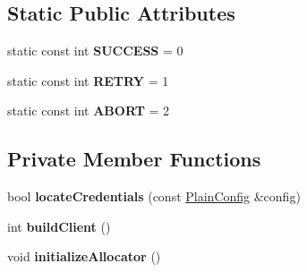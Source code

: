 \subsection*{Static Public Attributes}
\begin{DoxyCompactItemize}
\item 
\mbox{\label{class_aws_1_1_iot_1_1_device_client_1_1_shared_crt_resource_manager_ae853200444418700fe8c6c2384d1a981}} 
static const int {\bfseries S\+U\+C\+C\+E\+SS} = 0
\item 
\mbox{\label{class_aws_1_1_iot_1_1_device_client_1_1_shared_crt_resource_manager_a4ea6b778c387b63abeaee2d0099f6044}} 
static const int {\bfseries R\+E\+T\+RY} = 1
\item 
\mbox{\label{class_aws_1_1_iot_1_1_device_client_1_1_shared_crt_resource_manager_a60e67742ab42176a7a1b3c9a4100779e}} 
static const int {\bfseries A\+B\+O\+RT} = 2
\end{DoxyCompactItemize}
\subsection*{Private Member Functions}
\begin{DoxyCompactItemize}
\item 
\mbox{\label{class_aws_1_1_iot_1_1_device_client_1_1_shared_crt_resource_manager_a754e8d34e2ace5c551753c581653c254}} 
bool {\bfseries locate\+Credentials} (const \hyperlink{struct_aws_1_1_iot_1_1_device_client_1_1_plain_config}{Plain\+Config} \&config)
\item 
\mbox{\label{class_aws_1_1_iot_1_1_device_client_1_1_shared_crt_resource_manager_a4547bba8601c2dfce969476224e19061}} 
int {\bfseries build\+Client} ()
\item 
\mbox{\label{class_aws_1_1_iot_1_1_device_client_1_1_shared_crt_resource_manager_a505c7645153752b656ec02614671e5f0}} 
void {\bfseries initialize\+Allocator} ()
\end{DoxyCompactItemize}
